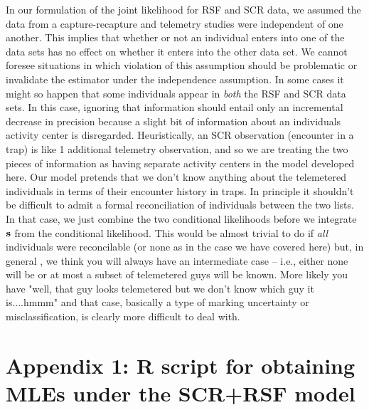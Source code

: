 In our formulation of the joint likelihood for RSF and SCR data, we
assumed the data from a capture-recapture and telemetry studies were
independent of one another. This implies that whether or not an
individual enters into one of the data sets has no effect on whether
it enters into the other data set. We cannot foresee situations in
which violation of this assumption should be problematic or invalidate
the estimator under the independence assumption.  In some cases it
might so happen that some individuals appear in {\it both} the RSF and
SCR data sets. In this case, ignoring that information should entail
only an incremental decrease in precision because a slight bit of
information about an individuals activity center is
disregarded. Heuristically, an SCR observation (encounter in a trap)
is like 1 additional telemetry observation, and so we are treating the
two pieces of information as having separate activity centers in the
model developed here.  Our model pretends that we don't know anything
about the telemetered individuals in terms of their encounter history
in traps.  In principle it shouldn't be difficult to admit a formal
reconciliation of individuals between the two lists. In that case, we
just combine the two conditional likelihoods before we integrate ${\bf
  s}$ from the conditional likelihood. This would be almost trivial to
do if {\it all} individuals were reconcilable (or none as in the case
we have covered here) but, in general , we think you will always have
an intermediate case -- i.e., either none will be or at most a subset
of telemetered guys will be known. More likely you have "well, that
guy looks telemetered but we don't know which guy it is....hmmm" and
that case, basically a type of marking uncertainty or
misclassification, is clearly more difficult to deal with.


\section*{Appendix 1: {\bf R} script for obtaining MLEs under the SCR+RSF model}





















